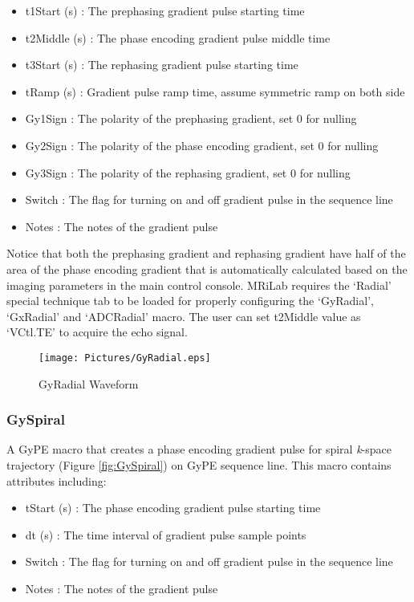 \documentclass{book}%
\begin{document}
\begin{itemize}
	\item t1Start (s) : The prephasing gradient pulse starting time
	\item t2Middle (s) : The phase encoding gradient pulse middle time
	\item t3Start (s) : The rephasing gradient pulse starting time
	\item tRamp (s) : Gradient pulse ramp time, assume symmetric ramp on both side
	\item Gy1Sign : The polarity of the prephasing gradient, set 0 for nulling
	\item Gy2Sign : The polarity of the phase encoding gradient, set 0 for nulling
  \item Gy3Sign : The polarity of the rephasing gradient, set 0 for nulling
	\item Switch : The flag for turning on and off gradient pulse in the sequence line
	\item Notes : The notes of the gradient pulse 
\end{itemize}

Notice that both the prephasing gradient and rephasing gradient have half of the area of the phase encoding gradient that is automatically calculated based on the imaging parameters in the main control console. MRiLab requires the `Radial' special technique tab to be loaded for properly configuring the `GyRadial', `GxRadial' and `ADCRadial' macro. The user can set t2Middle value as `VCtl.TE' to acquire the echo signal.

\begin{figure}[htbp]
	\centering
		\texttt{[image: Pictures/GyRadial.eps]}
	\caption{GyRadial Waveform}
	\label{fig:GyRadial}
\end{figure}

\subsubsection{GySpiral}

A GyPE macro that creates a phase encoding gradient pulse for spiral \textit{k}-space trajectory (Figure \ref{fig:GySpiral}) on GyPE sequence line. This macro contains attributes including:

\begin{itemize}
	\item tStart (s) : The phase encoding gradient pulse starting time
	\item dt (s) : The time interval of gradient pulse sample points
	\item Switch : The flag for turning on and off gradient pulse in the sequence line
	\item Notes : The notes of the gradient pulse 
\end{itemize}
\end{document}
